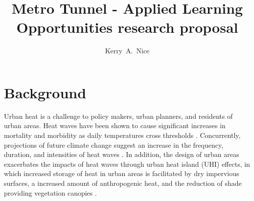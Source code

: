 \documentclass[final,3p,times,authoryear]{elsarticle}
\begin{document}
\begin{frontmatter}



\title{Metro Tunnel - Applied Learning Opportunities research proposal}




\author[melb]{Kerry~A.~Nice}

\address[melb]{Transport, Health, and Urban Design Hub, Faculty of Architecture, Building, and Planning, University of Melbourne, Victoria 3010, Australia}






\begin{abstract}



\end{abstract}


\end{frontmatter}







\section{Background}\label{sec:introduction}



Urban heat is a challenge to policy makers, urban planners, and residents of urban areas. Heat waves have been shown to cause significant increases in mortality and morbidity as daily temperatures cross thresholds \citep{Nicholls2008}. Concurrently, projections of future climate change suggest an increase in the frequency, duration, and intensities of heat waves \citep{Alexander2009}. In addition, the design of urban areas exacerbates the impacts of heat waves through urban heat island (UHI) effects, in which increased storage of heat in urban areas is facilitated by dry impervious surfaces, a increased amount of anthropogenic heat, and the reduction of shade providing vegetation canopies \citep{Coutts2012}.
\end{document}

